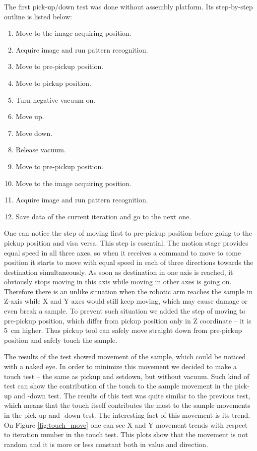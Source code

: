 The first pick-up/down test was done without assembly platform. Its step-by-step outline is listed below:
\begin{enumerate}
\setlength\itemsep{-0.5em}
\item Move to the image acquiring position.
\item Acquire image and run pattern recognition.
\item Move to pre-pickup position.
\item Move to pickup position.
\item Turn negative vacuum on.
\item Move up.
\item Move down.
\item Release vacuum.
\item Move to pre-pickup position.
\item Move to the image acquiring position.
\item Acquire image and run pattern recognition.
\item Save data of the current iteration and go to the next one.
\end{enumerate}

One can notice the step of moving first to pre-pickup position before going to the pickup position and visa versa. This step is essential. The motion stage provides equal speed in all three axes, so when it receives a command to move to some position it starts to move with equal speed in each of three directions towards the destination simultaneously. As soon as destination in one axis is reached, it obviously stops moving in this axis while moving in other axes is going on. Therefore there is an unlike situation when the robotic arm reaches the sample in Z-axis while X and Y axes would still keep moving, which may cause damage or even break a sample. To prevent such situation we added the step of moving to pre-pickup position, which differ from pickup position only in Z coordinate -- it is 5~cm higher. Thus pickup tool can safely move straight down from pre-pickup position and safely touch the sample.

The results of the test showed movement of the sample, which could be noticed with a naked eye. In order to minimize this movement we decided to make a touch test -- the same as pickup and setdown, but without vacuum. Such kind of test can show the contribution of the touch to the sample movement in the pick-up and -down test. The results of this test was quite similar to the previous test, which means that the touch itself contributes the most to the sample movements in the pick-up and -down test. The interesting fact of this movement is its trend. On Figure \ref{fig:touch_move} one can see X and Y movement trends with respect to iteration number in the touch test. This plots show that the movement is not random and it is more or less constant both in value and direction.

